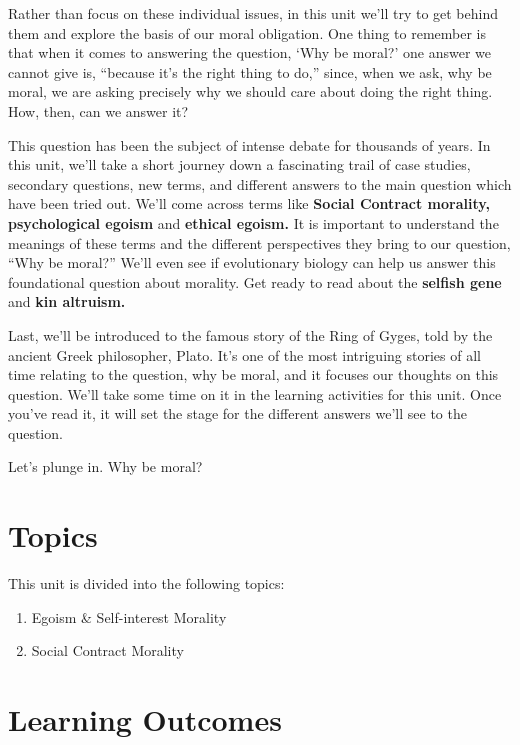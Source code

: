 \documentclass[
]{book}
\providecommand{\tightlist}{%
  \setlength{\itemsep}{0pt}\setlength{\parskip}{0pt}}
\begin{document}
Rather than focus on these individual issues, in this unit we'll try to get behind them and explore the basis of our moral obligation. One thing to remember is that when it comes to answering the question, `Why be moral?' one answer we cannot give is, ``because it's the right thing to do,'' since, when we ask, why be moral, we are asking precisely why we should care about doing the right thing. How, then, can we answer it?

This question has been the subject of intense debate for thousands of years. In this unit, we'll take a short journey down a fascinating trail of case studies, secondary questions, new terms, and different answers to the main question which have been tried out. We'll come across terms like \textbf{Social Contract morality, psychological egoism} and \textbf{ethical egoism.} It is important to understand the meanings of these terms and the different perspectives they bring to our question, ``Why be moral?'' We'll even see if evolutionary biology can help us answer this foundational question about morality. Get ready to read about the \textbf{selfish gene} and \textbf{kin altruism.}

Last, we'll be introduced to the famous story of the Ring of Gyges, told by the ancient Greek philosopher, Plato. It's one of the most intriguing stories of all time relating to the question, why be moral, and it focuses our thoughts on this question. We'll take some time on it in the learning activities for this unit. Once you've read it, it will set the stage for the different answers we'll see to the question.

Let's plunge in. Why be moral?

\hypertarget{topics-1}{%
\section*{Topics}\label{topics-1}}

This unit is divided into the following topics:

\begin{enumerate}
\def\labelenumi{\arabic{enumi}.}
\tightlist
\item
  Egoism \& Self-interest Morality
\item
  Social Contract Morality
\end{enumerate}

\hypertarget{learning-outcomes-1}{%
\section*{Learning Outcomes}\label{learning-outcomes-1}}
\end{document}
